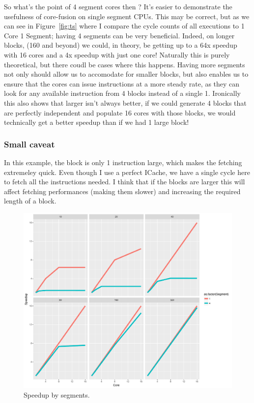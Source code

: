 So what's the point of 4 segment cores then ? It's easier to demonstrate the usefulness of core-fusion on single segment CPUs.
This may be correct, but as we can see in Figure~\ref{fig:ts} where I compare the cycle counts of all executions to 1 Core 1 Segment; having 4 segments can be very beneficial.
Indeed, on longer blocks, (160 and beyond) we could, in theory, be getting up to a 64x speedup with 16 cores and a 4x speedup with just one core!
Naturally this is purely theoretical, but there coudl be cases where this happens.
Having more segments not only should allow us to accomodate for smaller blocks, but also enables us to ensure that the cores can issue instructions at a more steady rate, as they can look for any available instruction from 4 blocks instead of a single 1.
Ironically this also shows that larger isn't always better, if we could generate 4 blocks that are perfectly independent and populate 16 cores with those blocks, we would technically get a better speedup than if we had 1 large block!

\subsubsection{Small caveat}

In this example, the block is only 1 instruction large, which makes the fetching extremeley quick.
Even though I use a perfect ICache, we have a single cycle here to fetch all the instructions needed.
I think that if the blocks are larger this will affect fetching performances (making them slower) and increasing the required length of a block.

\begin{figure}
\center
  \includegraphics[width=1\textwidth]{chapter3/graphics/lengths_segment_speed.pdf}
  \caption{Speedup by segments.}\label{fig:lss}
\end{figure}

